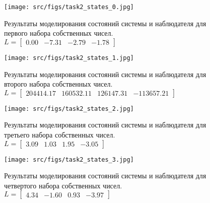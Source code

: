 \begin{figure}[ht!]
    \centering
    \texttt{[image: src/figs/task2\_states\_0.jpg]}
    \caption{Результаты моделирования состояний системы и наблюдателя для первого набора собственных чисел. \(L = \begin{bmatrix} 0.00 & -7.31 & -2.79 & -1.78 \end{bmatrix}\)}
    \label{fig:task2_states_1}
\end{figure}
\begin{figure}[ht!]
    \centering
    \texttt{[image: src/figs/task2\_states\_1.jpg]}
    \caption{Результаты моделирования состояний системы и наблюдателя для второго набора собственных чисел. \(L = \begin{bmatrix} 204414.17 &  160532.11 &  126147.31 & -113657.21 \end{bmatrix}\) }
    \label{fig:task2_states_2}
\end{figure}
\begin{figure}[ht!]
    \centering
    \texttt{[image: src/figs/task2\_states\_2.jpg]}
    \caption{Результаты моделирования состояний системы и наблюдателя для третьего набора собственных чисел. \(L = \begin{bmatrix} 3.09 &  1.03 &  1.95 & -3.05 \end{bmatrix}\)}
    \label{fig:task2_states_3}
\end{figure}
\begin{figure}[ht!]
    \centering
    \texttt{[image: src/figs/task2\_states\_3.jpg]}
    \caption{Результаты моделирования состояний системы и наблюдателя для четвертого набора собственных чисел. \(L = \begin{bmatrix} 4.34 & -1.60 &  0.93 & -3.97 \end{bmatrix}\)}
    \label{fig:task2_states_4}
\end{figure}

